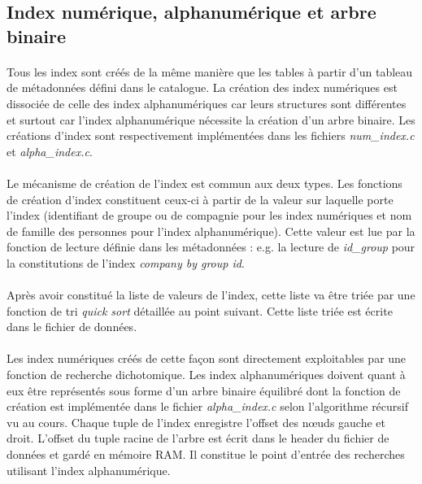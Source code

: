 \documentclass{article}
\begin{document}
    \subsection{Index numérique, alphanumérique et arbre binaire}
    \paragraph{}
    Tous les index sont créés de la même manière que les tables à partir d'un tableau de métadonnées défini dans le catalogue. La création des index numériques est dissociée de celle des index alphanumériques car leurs structures sont différentes et surtout car l'index alphanumérique nécessite la création d'un arbre binaire. Les créations d'index sont respectivement implémentées dans les fichiers \emph{num\_index.c} et \emph{alpha\_index.c}.

    \paragraph{}
    Le mécanisme de création de l'index est commun aux deux types. Les fonctions de création d'index constituent ceux-ci à partir de la valeur sur laquelle porte l'index (identifiant de groupe ou de compagnie pour les index numériques et nom de famille des personnes pour l'index alphanumérique). Cette valeur est lue par la fonction de lecture définie dans les métadonnées : e.g. la lecture de \emph{id\_group} pour la constitutions de l'index \emph{company by group id}.

    \paragraph{}
    Après avoir constitué la liste de valeurs de l'index, cette liste va être triée par une fonction de tri \emph{quick sort} détaillée au point suivant. Cette liste triée est écrite dans le fichier de données.

    \paragraph{}
    Les index numériques créés de cette façon sont directement exploitables par une fonction de recherche dichotomique. Les index alphanumériques doivent quant à eux être représentés sous forme d'un arbre binaire équilibré dont la fonction de création est implémentée dans le fichier \emph{alpha\_index.c} selon l'algorithme récursif vu au cours. Chaque tuple de l'index enregistre l'offset des n\oe uds gauche et droit. L'offset du tuple racine de l'arbre est écrit dans le header du fichier de données et gardé en mémoire RAM. Il constitue le point d'entrée des recherches utilisant l'index alphanumérique.
\end{document}
